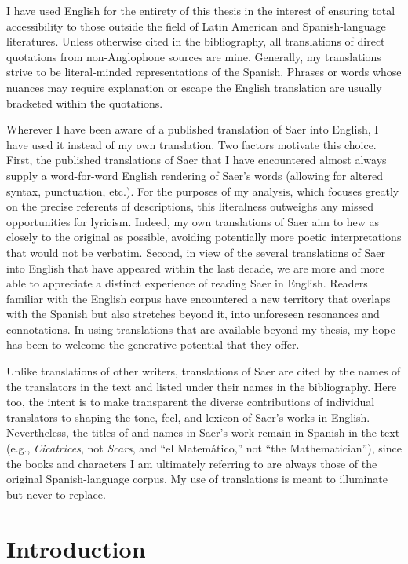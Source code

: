 \documentclass[11pt]{report}
\begin{document}
I have used English for the entirety of this thesis in the interest of ensuring total accessibility to those outside the field of Latin American and Spanish-language literatures. Unless otherwise cited in the bibliography, all translations of direct quotations from non-Anglophone sources are mine. Generally, my translations strive to be literal-minded representations of the Spanish. Phrases or words whose nuances may require explanation or escape the English translation are usually bracketed within the quotations.

Wherever I have been aware of a published translation of Saer into English, I have used it instead of my own translation. Two factors motivate this choice. First, the published translations of Saer that I have encountered almost always supply a word-for-word English rendering of Saer's words (allowing for altered syntax, punctuation, etc.). For the purposes of my analysis, which focuses greatly on the precise referents of descriptions, this literalness outweighs any missed opportunities for lyricism. Indeed, my own translations of Saer aim to hew as closely to the original as possible, avoiding potentially more poetic interpretations that would not be verbatim. Second, in view of the several translations of Saer into English that have appeared within the last decade, we are more and more able to appreciate a distinct experience of reading Saer in English. Readers familiar with the English corpus have encountered a new territory that overlaps with the Spanish but also stretches beyond it, into unforeseen resonances and connotations. In using translations that are available beyond my thesis, my hope has been to welcome the generative potential that they offer.

Unlike translations of other writers, translations of Saer are cited by the names of the translators in the text and listed under their names in the bibliography. Here too, the intent is to make transparent the diverse contributions of individual translators to shaping the tone, feel, and lexicon of Saer's works in English. Nevertheless, the titles of and names in Saer's work remain in Spanish in the text (e.g., \textit{Cicatrices}, not \textit{Scars}, and ``el Matemático,'' not ``the Mathematician''), since the books and characters I am ultimately referring to are always those of the original Spanish-language corpus. My use of translations is meant to illuminate but never to replace.

\chapter*{Introduction} \label{ch:introduction}

\end{document}
